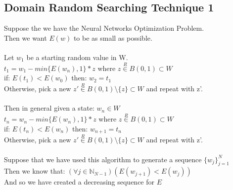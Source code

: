 \documentclass[12pt]{extarticle}
\theoremstyle{plain}
\theoremstyle{plain}
\theoremstyle{plain}
\theoremstyle{Definition}
\theoremstyle{Definition}
\theoremstyle{plain}
\theoremstyle{plain}
\begin{document}
		\subsection{Domain Random Searching Technique 1}
		Suppose the we have the Neural Networks Optimization Problem. \\ 
		Then we want $E(w)$ to be as small as possible. \\ \\
		Let $w_1$ be a starting random value in W. \\ 
		$t_1 = w_1 - min\{E(w_n),1\}*z$ where $z \overset{R}{\in} B(0,1) \subset W$ \\ 
		if: $E(t_1) < E(w_0)$ then: $w_2 = t_1$ \\ 
		Otherwise, pick a new $z' \overset{R}{\in} B(0,1) \setminus \{z\} \subset W$ and repeat with z'. \\ \\
		Then in general given a state: $w_n \in W$ \\
		$t_{n} = w_n - min\{E(w_n),1\}*z$ where $z \overset{R}{\in} B(0,1) \subset W$ \\ 
		if: $E(t_{n}) < E(w_n)$ then: $w_{n+1} = t_{n}$ \\
		Otherwise, pick a new $z' \overset{R}{\in} B(0,1) \setminus \{z\} \subset W$ and repeat with z'.  \\ \\
		Suppose that we have used this algorithm to generate a sequence $\{w_j\}_{j=1}^N$ \\ 
		Then we know that: $(\forall j \in \mathbb{N}_{N-1})(E(w_{j+1}) < E(w_j))$ \\
		And so we have created a decreasing sequence for $E$
		\newpage
\end{document}
